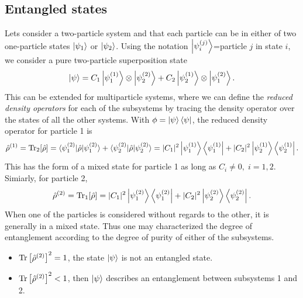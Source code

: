 \subsection{Entangled states}
Lets consider a two-particle system and that each particle can be in either of two one-particle states $\left|\psi_1\right\rangle$ or $\left|\psi_2\right\rangle$. Using the notation 
$\left|\psi_i^{(j)}\right\rangle$=particle $j$ in state $i$, we consider a pure two-particle superposition state 
\begin{align*}
    \left|\psi\right\rangle=C_1\left|\psi_1^{(1)}\right\rangle\otimes\left|\psi_2^{(2)}\right\rangle+C_2\left|\psi_2^{(1)}\right\rangle\otimes\left|\psi_1^{(2)}\right\rangle.
\end{align*}
This can be extended for multiparticle systems, where we can define the \emph{reduced density operators} for each of the subsystems by tracing the 
density operator over the states of all the other systems. With $\phi=\left|\psi\right\rangle\left\langle\psi\right|$, the reduced density operator for particle 1 is 
\begin{align*}
    \hat{\rho}^{(1)}=\text{Tr}_2[\hat{\rho}]=\langle\psi_1^{(2)}|\hat{\rho}|\psi_1^{(2)}\rangle+\langle\psi_2^{(2)}|\hat{\rho}|\psi_2^{(2)}\rangle=|C_1|^2\left|\psi_1^{(1)}\right\rangle\left\langle\psi_1^{(1)}\right|
    +|C_2|^2\left|\psi_2^{(1)}\right\rangle\left\langle\psi_2^{(1)}\right|.
\end{align*}
This has the form of a mixed state for particle 1 as long as $C_i\neq0,\;i=1,2$. Simiarly, for particle 2,
\begin{align*}
    \hat{\rho}^{(2)}=\text{Tr}_1[\hat{\rho}]=|C_1|^2\left|\psi_1^{(2)}\right\rangle\left\langle\psi_1^{(2)}\right|
    +|C_2|^2\left|\psi_2^{(2)}\right\rangle\left\langle\psi_2^{(2)}\right|.
\end{align*}
When one of the particles is considered without regards to the other, it is generally in a mixed state. Thus one may characterized the degree of 
entanglement according to the degree of purity of either of the subsystems. 
\begin{itemize}[itemsep=0pt,topsep=0pt,parsep=0pt]
    \item $\text{Tr}\left[\hat{\rho}^{(2)}\right]^2=1$, the state $\left|\psi\right\rangle$ is not an entangled state.
    \item $\text{Tr}\left[\hat{\rho}^{(2)}\right]^2<1$, then $\left|\psi\right\rangle$ describes an entanglement between subsystems 1 and 2.
\end{itemize}





